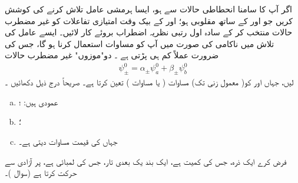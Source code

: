   اگر آپ کا سامنا انحطاطی حالات سے ہو،  ایسا ہرمشی عامل  تلاش کرنے کی کوشش کریں جو  اور  کے ساتھ  مقلوبی  ہو؛   اور  کے بیک وقت امتیازی تفاعلات کو  غیر مضطرب حالات منتخب کر کے سادہ اول رتبی نظریہ اضطراب بروئے کار لائیں۔ ایسے عامل کی  تلاش  میں ناکامی  کی صورت میں آپ کو مساوات   استعمال کرنا ہو گا،  جس کی ضرورت عملاً  کم ہی پڑتی ہے ۔
  دو"موزوں" غیر مضطرب حالات
\begin{align*}
\psi_\pm^0 = \alpha_\pm \psi_a^0 + \beta_\pm \psi_b^0
\end{align*}
لیں، جہاں  اور  کو( معمول زنی  تک)  مساوات  (  یا مساوات )   تعین کرتا ہے۔   صریحاً  درج ذیل دکھائیں ۔
\begin{enumerate}[a.]
\item
{} عمودی ہیں:    ؛
\item
{} ؛
\item
{} جہاں  کی قیمت مساوات  دیتی ہے۔ 
\end{enumerate}
فرض کرے ایک ذرہ،  جس کی کمیت  ہے،  ایک  بند یک بعدی تار،  جس کی لمبائی  ہے،  پر آزادی سے حرکت کرتا ہے (سوال )۔ 
